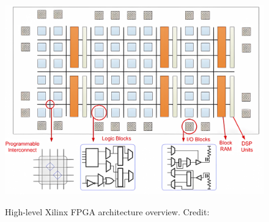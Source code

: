 \begin{figure}[t]
\centering
\caption{High-level Xilinx FPGA architecture overview. Credit:~\cite{fpga_diagram}}
\includegraphics[width=1\textwidth]{graphic/fpga_diagramx4.png}
\label{fig:fpga_diagram}
\end{figure}